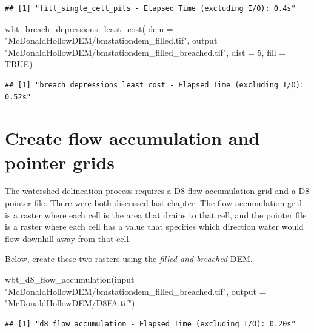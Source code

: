 \documentclass[
]{book}
\newenvironment{Shaded}{\begin{snugshade}}{\end{snugshade}}
\newcommand{\AttributeTok}[1]{\textcolor[rgb]{0.77,0.63,0.00}{#1}}
\newcommand{\ConstantTok}[1]{\textcolor[rgb]{0.00,0.00,0.00}{#1}}
\newcommand{\DecValTok}[1]{\textcolor[rgb]{0.00,0.00,0.81}{#1}}
\newcommand{\FunctionTok}[1]{\textcolor[rgb]{0.00,0.00,0.00}{#1}}
\newcommand{\NormalTok}[1]{#1}
\newcommand{\StringTok}[1]{\textcolor[rgb]{0.31,0.60,0.02}{#1}}
\begin{document}
\begin{verbatim}
## [1] "fill_single_cell_pits - Elapsed Time (excluding I/O): 0.4s"
\end{verbatim}

\begin{Shaded}
\begin{Highlighting}[]
\FunctionTok{wbt\_breach\_depressions\_least\_cost}\NormalTok{(}
                     \AttributeTok{dem =} \StringTok{"McDonaldHollowDEM/bmstationdem\_filled.tif"}\NormalTok{,}
                     \AttributeTok{output =} \StringTok{"McDonaldHollowDEM/bmstationdem\_filled\_breached.tif"}\NormalTok{,}
                     \AttributeTok{dist =} \DecValTok{5}\NormalTok{,}
                     \AttributeTok{fill =} \ConstantTok{TRUE}\NormalTok{)}
\end{Highlighting}
\end{Shaded}

\begin{verbatim}
## [1] "breach_depressions_least_cost - Elapsed Time (excluding I/O): 0.52s"
\end{verbatim}

\hypertarget{create-flow-accumulation-and-pointer-grids}{%
\section{Create flow accumulation and pointer grids}\label{create-flow-accumulation-and-pointer-grids}}

The watershed delineation process requires a D8 flow accumulation grid and a D8 pointer file. There were both discussed last chapter. The flow accumulation grid is a raster where each cell is the area that drains to that cell, and the pointer file is a raster where each cell has a value that specifies which direction water would flow downhill away from that cell.

Below, create these two rasters using the \emph{filled and breached} DEM.

\begin{Shaded}
\begin{Highlighting}[]
\FunctionTok{wbt\_d8\_flow\_accumulation}\NormalTok{(}\AttributeTok{input =} \StringTok{"McDonaldHollowDEM/bmstationdem\_filled\_breached.tif"}\NormalTok{,}
                         \AttributeTok{output =} \StringTok{"McDonaldHollowDEM/D8FA.tif"}\NormalTok{)}
\end{Highlighting}
\end{Shaded}

\begin{verbatim}
## [1] "d8_flow_accumulation - Elapsed Time (excluding I/O): 0.20s"
\end{verbatim}
\end{document}

